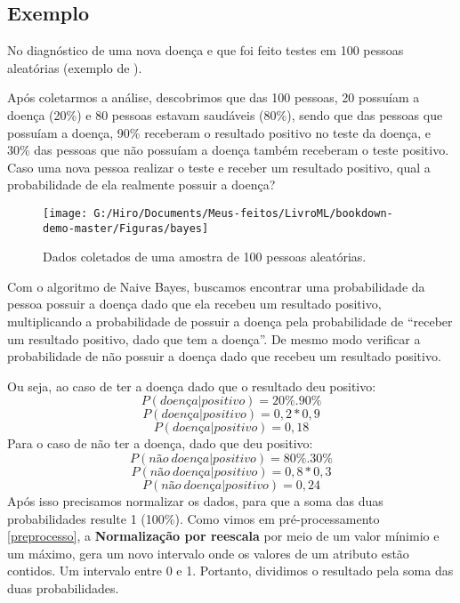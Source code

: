 \documentclass[
  openany]{book}
\begin{document}
\hypertarget{exbayes}{%
\subsection{Exemplo}\label{exbayes}}

No diagnóstico de uma nova doença e que foi feito testes em 100 pessoas aleatórias (exemplo de \citet{organica}).

Após coletarmos a análise, descobrimos que das 100 pessoas, 20 possuíam a doença (20\%) e 80 pessoas estavam saudáveis (80\%), sendo que das pessoas que possuíam a doença, 90\% receberam o resultado positivo no teste da doença, e 30\% das pessoas que não possuíam a doença também receberam o teste positivo. Caso uma nova pessoa realizar o teste e receber um resultado positivo, qual a probabilidade de ela realmente possuir a doença?

\begin{figure}

{\centering \texttt{[image: G:/Hiro/Documents/Meus-feitos/LivroML/bookdown-demo-master/Figuras/bayes]} 

}

\caption{Dados coletados de uma amostra de 100 pessoas aleatórias.}\label{fig:bayes}
\end{figure}



Com o algoritmo de Naive Bayes, buscamos encontrar uma probabilidade da pessoa possuir a doença dado que ela recebeu um resultado positivo, multiplicando a probabilidade de possuir a doença pela probabilidade de ``receber um resultado positivo, dado que tem a doença''. De mesmo modo verificar a probabilidade de não possuir a doença dado que recebeu um resultado positivo.

Ou seja, ao caso de ter a doença dado que o resultado deu positivo:
\[P(doença|positivo) = 20\% . 90\% \] \[P(doença|positivo) = 0,2 * 0,9 \] \[P(doença|positivo) = 0,18\]
Para o caso de não ter a doença, dado que deu positivo:
\[P(não \ doença|positivo) = 80\%.30\%\]
\[P(não \ doença|positivo) = 0,8 * 0,3\]
\[P(não\ doença|positivo) = 0,24\]
Após isso precisamos normalizar os dados, para que a soma das duas probabilidades resulte 1 (100\%). Como vimos em pré-processamento \ref{preprocesso}, a \textbf{Normalização por reescala} por meio de um valor mínimio e um máximo, gera um novo intervalo onde os valores de um atributo estão contidos. Um intervalo entre 0 e 1. Portanto, dividimos o resultado pela soma das duas probabilidades.
\end{document}
